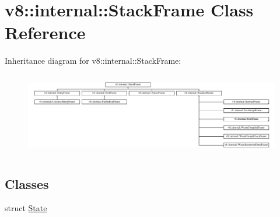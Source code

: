 \hypertarget{classv8_1_1internal_1_1StackFrame}{}\section{v8\+:\+:internal\+:\+:Stack\+Frame Class Reference}
\label{classv8_1_1internal_1_1StackFrame}
Inheritance diagram for v8\+:\+:internal\+:\+:Stack\+Frame\+:\begin{figure}[H]
\begin{center}
\leavevmode
\includegraphics[height=3.642277cm]{classv8_1_1internal_1_1StackFrame}
\end{center}
\end{figure}
\subsection*{Classes}
\begin{DoxyCompactItemize}
\item 
struct \mbox{\hyperlink{structv8_1_1internal_1_1StackFrame_1_1State}{State}}
\end{DoxyCompactItemize}
